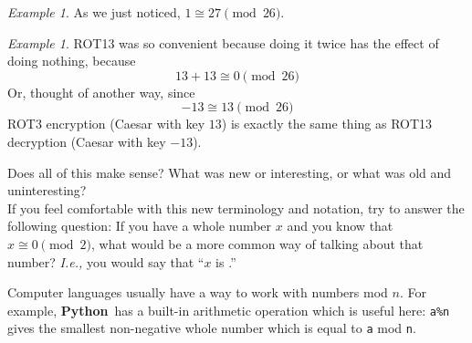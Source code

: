 \documentclass[12pt,letterpaper]{amsbook}
\theoremstyle{definition}
\theoremstyle{remark}
\newtheorem{example}[theorem]{Example}
\numberwithin{figure}{section}
\numberwithin{exercise}{chapter}
\numberwithin{section}{chapter}
\numberwithin{equation}{section}
\numberwithin{table}{subsection}
\newcommand{\code}[1]{\colorbox{lg}{\texttt{#1}}}
\newcommand{\Python}{{\textbf{\ix{Python}}}}
\newcommand{\ix}[1]{{#1}\index{#1}}
\begin{document}
\begin{example}
  As we just noticed, $1\cong27\pmod{26}$.
\end{example}
\begin{example}
  ROT13 was so convenient because doing it twice has the effect of doing
  nothing, because
  $$
  13+13\cong0\pmod{26}
  $$
  Or, thought of another way, since
  $$
  -13\cong13\pmod{26}
  $$
  ROT3 encryption (Caesar with key $13$) is exactly the same thing as ROT13
  decryption (Caesar with key $-13$).
\end{example}

\vskip2mm
\begin{AZtcb}[label=az:mod26]{}{}
Does all of this make sense?  What was new or interesting, or what was old and
uninteresting?\\
If you feel comfortable with this new terminology and notation, try to
answer the following question: If you have a whole number $x$ and you know
that $x\cong0\pmod{2}$, what would be a more common way of talking about
that number?  \textit{I.e.,} you would say that ``$x$ is
\underline{\hphantom{XXX}}.''
\end{AZtcb}
\vskip2mm

Computer languages usually have a way to work with numbers mod $n$.  For
example, \Python\ has a built-in arithmetic operation which is useful
here: \code{a\%n} gives the smallest non-negative whole number which
is equal to \code{a} mod \code{n}.
\end{document}
